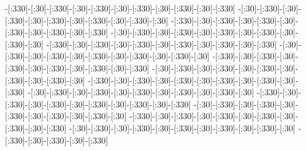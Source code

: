 -[:330]-[:30]-[:330]-[:30]-[:330]-[:30]-[:330]-[:30]-[:330]-[:30]-[:330]%
-[:30]-[:330]-[:30]-[:330]-[:30]-[:330]-[:30]-[:330]-[:30]-[:330]-[:30]%
-[:330]-[:30]-[:330]-[:30]-[:330]-[:30]-[:330]-[:30]-[:330]-[:30]-[:330]%
-[:30]-[:330]-[:30]-[:330]-[:30]-[:330]-[:30]-[:330]-[:30]-[:330]-[:30]%
-[:330]-[:30]-[:330]-[:30]-[:330]-[:30]-[:330]-[:30]-[:330]-[:30]-[:330]%
-[:30]-[:330]-[:30]-[:330]-[:30]-[:330]-[:30]-[:330]-[:30]-[:330]-[:30]%
-[:330]-[:30]-[:330]-[:30]-[:330]-[:30]-[:330]-[:30]-[:330]-[:30]-[:330]%
-[:30]-[:330]-[:30]-[:330]-[:30]-[:330]-[:30]-[:330]-[:30]-[:330]-[:30]%
-[:330]-[:30]-[:330]-[:30]-[:330]-[:30]-[:330]-[:30]-[:330]-[:30]-[:330]%
-[:30]-[:330]-[:30]-[:330]-[:30]-[:330]-[:30]-[:330]-[:30]-[:330]-[:30]%
-[:330]-[:30]-[:330]-[:30]-[:330]-[:30]-[:330]-[:30]-[:330]-[:30]-[:330]%
-[:30]-[:330]-[:30]-[:330]-[:30]-[:330]-[:30]-[:330]-[:30]-[:330]-[:30]%
-[:330]-[:30]-[:330]-[:30]-[:330]-[:30]-[:330]-[:30]-[:330]-[:30]-[:330]%
-[:30]-[:330]-[:30]-[:330]-[:30]-[:330]-[:30]-[:330]-[:30]-[:330]-[:30]%
-[:330]-[:30]-[:330]-[:30]-[:330]